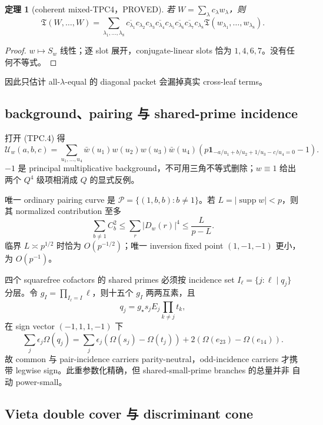 \documentclass[11pt,a4paper]{ctexart}
\newtheorem{theorem}{定理}[section]
\theoremstyle{definition}
\newcommand{\1}{\mathbf 1}
\newcommand{\supp}{\operatorname{supp}}
\newcommand{\PROVED}{\textcolor{green!40!black}{\textsf{PROVED}}}
\begin{document}
\begin{theorem}[coherent mixed-TPC4，\PROVED]
若 $W=\sum_\lambda c_\lambda w_\lambda$，则
\[
 \mathfrak T(W,\ldots,W)=\sum_{\lambda_1,\ldots,\lambda_8}
 \overline{c_{\lambda_1}}c_{\lambda_2}c_{\lambda_3}
 \overline{c_{\lambda_4}}c_{\lambda_5}
 \overline{c_{\lambda_6}}\overline{c_{\lambda_7}}c_{\lambda_8}
 \mathfrak T(w_{\lambda_1},\ldots,w_{\lambda_8}).  \tag{TPC.8}
\]
\end{theorem}
\begin{proof}
$w\mapsto S_w$ 线性；逐 slot 展开，conjugate-linear slots 恰为
$1,4,6,7$。没有任何不等式。
\end{proof}

因此只估计 all-$\lambda$-equal 的 diagonal packet 会漏掉真实 cross-leaf terms。

\subsection{background、pairing 与 shared-prime incidence}

打开 (TPC.4) 得
\[
 \mathcal U_w(a,b,c)=\sum_{u_1,\ldots,u_4}
 \bar w(u_1)w(u_2)w(u_3)\bar w(u_4)
 \left(p\1_{-a/u_1+b/u_2+1/u_3-c/u_4=0}-1\right).  \tag{TPC.9}
\]
$-1$ 是 principal multiplicative background，不可用三角不等式删除；$w\equiv1$
给出两个 $Q^4$ 级项相消成 $Q$ 的显式反例。

唯一 ordinary pairing curve 是
$\mathcal P=\{(1,b,b):b\ne1\}$。若 $L=|\supp w|<p$，则其 normalized
contribution 至多
\[
 \sum_{b\ne1}C_b^2\le\sum_r|D_w(r)|^4\le\frac{L}{p-L}.\tag{TPC.10}
\]
临界 $L\asymp p^{1/2}$ 时恰为 $O(p^{-1/2})$；唯一 inversion fixed point
$(1,-1,-1)$ 更小，为 $O(p^{-1})$。

四个 squarefree cofactors 的 shared primes 必须按 incidence set
$I_\ell=\{j:\ell\mid q_j\}$ 分层。令
$g_I=\prod_{I_\ell=I}\ell$，则十五个 $g_I$ 两两互素，且
\[
 q_j=g_\star s_jE_j\prod_{k\ne j}t_k,                \tag{TPC.11}
\]
在 sign vector $(-1,1,1,-1)$ 下
\[
 \sum_j\epsilon_j\Omega(q_j)
 =\sum_j\epsilon_j(\Omega(s_j)-\Omega(t_j))
 +2(\Omega(e_{23})-\Omega(e_{14})).                 \tag{TPC.12}
\]
故 common 与 pair-incidence carriers parity-neutral，odd-incidence carriers
才携带 legwise sign。此重参数化精确，但 shared-small-prime branches 的总量并非
自动 power-small。

\subsection{Vieta double cover 与 discriminant cone}
\end{document}
